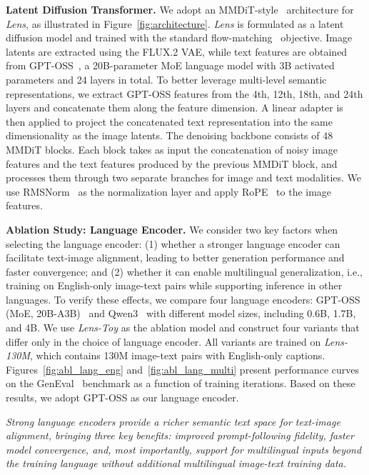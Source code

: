 \noindent\textbf{Latent Diffusion Transformer.}
We adopt an MMDiT-style~\citep{esser2024scaling} architecture for \textit{Lens}, as illustrated in Figure~\ref{fig:architecture}. \textit{Lens} is formulated as a latent diffusion model and trained with the standard flow-matching~\citep{lipman2023flow} objective. Image latents are extracted using the FLUX.2 VAE, while text features are obtained from GPT-OSS~\citep{openai2025gptoss120bgptoss20bmodel}, a 20B-parameter MoE language model with 3B activated parameters and 24 layers in total. To better leverage multi-level semantic representations, we extract GPT-OSS features from the 4th, 12th, 18th, and 24th layers and concatenate them along the feature dimension. A linear adapter is then applied to project the concatenated text representation into the same dimensionality as the image latents. The denoising backbone consists of 48 MMDiT blocks. Each block takes as input the concatenation of noisy image features and the text features produced by the previous MMDiT block, and processes them through two separate branches for image and text modalities. We use RMSNorm~\citep{zhang2019root} as the normalization layer and apply RoPE~\citep{su2024roformer} to the image features.




\noindent\textbf{Ablation Study: Language Encoder.}
We consider two key factors when selecting the language encoder: (1) whether a stronger language encoder can facilitate text-image alignment, leading to better generation performance and faster convergence; and (2) whether it can enable multilingual generalization, i.e., training on English-only image-text pairs while supporting inference in other languages. To verify these effects, we compare four language encoders: GPT-OSS (MoE, 20B-A3B)~\citep{openai2025gptoss120bgptoss20bmodel} and Qwen3~\citep{yang2025qwen3} with different model sizes, including 0.6B, 1.7B, and 4B. We use \textit{Lens-Toy} as the ablation model and construct four variants that differ only in the choice of language encoder. All variants are trained on \textit{Lens-130M}, which contains 130M image-text pairs with English-only captions. Figures~\ref{fig:abl_lang_eng} and~\ref{fig:abl_lang_multi} present performance curves on the GenEval~\citep{ghosh2023geneval} benchmark as a function of training iterations. Based on these results, we adopt GPT-OSS as our language encoder.

\begin{tcolorbox}[colback=gray!5,colframe=black]
\textit{Strong language encoders provide a richer semantic text space for text-image alignment, bringing three key benefits: improved prompt-following fidelity, faster model convergence, and, most importantly, support for multilingual inputs beyond the training language without additional multilingual image-text training data.}
\end{tcolorbox}



